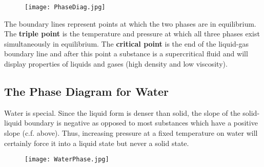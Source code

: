 \documentclass[../GChemReview.tex]{subfiles}
\begin{document}
	\begin{figure}[h]
		\centering
		\texttt{[image: PhaseDiag.jpg]}
	\end{figure}
	
	The boundary lines represent points at which the two phases are in equilibrium. The \textbf{triple point} is the temperature and pressure at which all three phases exist simultaneously in equilibrium. The \textbf{critical point} is the end of the liquid-gas boundary line and after this point a substance is a supercritical fluid and will display properties of liquids and gases (high density and low viscosity).
	
	\subsection{The Phase Diagram for Water}
	
	Water is special. Since the liquid form is denser than solid, the slope of the solid-liquid boundary is negative as opposed to most substances which have a positive slope (c.f. above). Thus, increasing pressure at a fixed temperature on water will certainly force it into a liquid state but never a solid state.
	
	\begin{figure}[h]
		\centering
		\texttt{[image: WaterPhase.jpg]}
	\end{figure}
	
	
\end{document}
